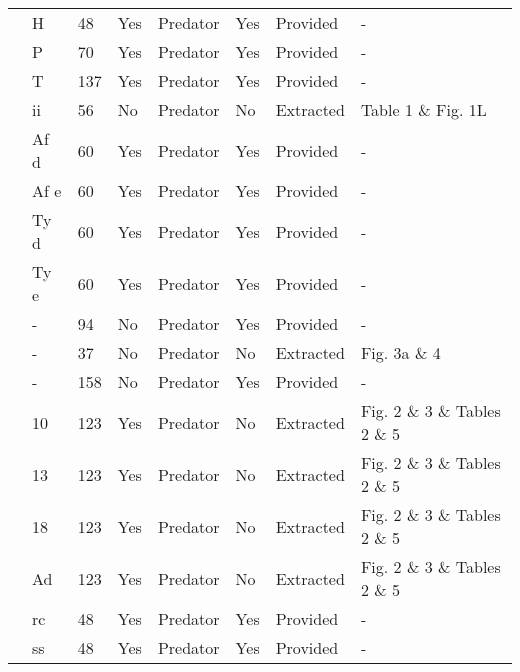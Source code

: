 \begin{longtable}{llllllll}
\citet{Kalinkat:2011bd}&H&48&Yes&Predator&Yes&Provided&-\tabularnewline
\citet{Kalinkat:2011bd}&P&70&Yes&Predator&Yes&Provided&-\tabularnewline
\citet{Kalinkat:2011bd}&T&137&Yes&Predator&Yes&Provided&-\tabularnewline
\citet{Krylov:1992aa}&ii&56&No&Predator&No&Extracted&Table 1 \& Fig. 1L\tabularnewline
\citet{Lester:2002aa}&Af d&60&Yes&Predator&Yes&Provided&-\tabularnewline
\citet{Lester:2002aa}&Af e&60&Yes&Predator&Yes&Provided&-\tabularnewline
\citet{Lester:2002aa}&Ty d&60&Yes&Predator&Yes&Provided&-\tabularnewline
\citet{Lester:2002aa}&Ty e&60&Yes&Predator&Yes&Provided&-\tabularnewline
\citet{Long:2012ab}&-&94&No&Predator&Yes&Provided&-\tabularnewline
\citet{Mattila:1998aa}&-&37&No&Predator&No&Extracted&Fig. 3a \& 4\tabularnewline
\citet{Nachappa:2006aa}&-&158&No&Predator&Yes&Provided&-\tabularnewline
\citet{Ranta:1985aa}&10&123&Yes&Predator&No&Extracted&Fig. 2 \& 3 \& Tables 2 \& 5\tabularnewline
\citet{Ranta:1985aa}&13&123&Yes&Predator&No&Extracted&Fig. 2 \& 3 \& Tables 2 \& 5\tabularnewline
\citet{Ranta:1985aa}&18&123&Yes&Predator&No&Extracted&Fig. 2 \& 3 \& Tables 2 \& 5\tabularnewline
\citet{Ranta:1985aa}&Ad&123&Yes&Predator&No&Extracted&Fig. 2 \& 3 \& Tables 2 \& 5\tabularnewline
\citet{Wong:2005aa}&rc&48&Yes&Predator&Yes&Provided&-\tabularnewline
\citet{Wong:2005aa}&ss&48&Yes&Predator&Yes&Provided&-\tabularnewline
\hline
\end{longtable}
